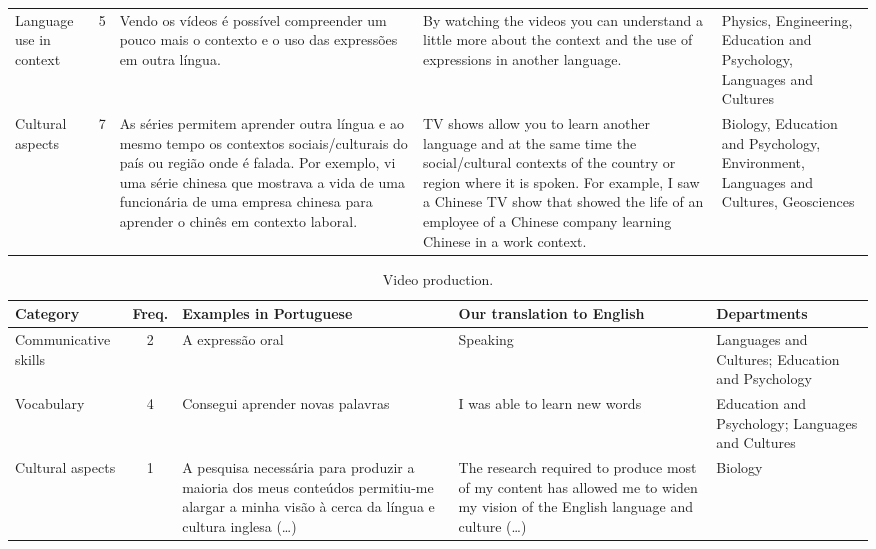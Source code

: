 \begin{table}[htpb]
\begin{threeparttable}
\begin{tabular}{p{1.5cm} c p{3cm} p{3cm} p{3cm}}
Language use in context & 5 & Vendo os vídeos é possível compreender um pouco mais o contexto e o uso das expressões em outra língua. & By watching the videos you can understand a little more about the context and the use of expressions in another language. & Physics, Engineering, Education and Psychology, Languages and Cultures \\
Cultural aspects & 7 & As séries permitem aprender outra língua e ao mesmo tempo os contextos sociais/culturais do país ou região onde é falada. Por exemplo, vi uma série chinesa que mostrava a vida de uma funcionária de uma empresa chinesa para aprender o chinês em contexto laboral. & TV shows allow you to learn another language and at the same time the social/cultural contexts of the country or region where it is spoken. For example, I saw a Chinese TV show that showed the life of an employee of a Chinese company learning Chinese in a work context. & Biology, Education and Psychology, Environment, Languages and Cultures, Geosciences \\
\bottomrule
\end{tabular}
\end{threeparttable}
\end{table}



\newpage
\begin{table}[htbp]
\centering
\footnotesize
\begin{threeparttable}
\begin{tabular}{p{1.5cm} c p{3cm} p{3cm} p{3cm}}
\caption{Video production.}
\label{tab-08}\\
\toprule
Category & Freq. & Examples in Portuguese & Our translation to English & Departments \\
\midrule
Communicative skills & 2 & A expressão oral & Speaking & Languages and Cultures; Education and Psychology \\
Vocabulary & 4 & Consegui aprender novas palavras & I was able to learn new words & Education and Psychology; Languages and Cultures \\
Cultural aspects & 1 & A pesquisa necessária para produzir a maioria dos meus conteúdos permitiu-me alargar a minha visão à cerca da língua e cultura inglesa (\ldots) & The research required to produce most of my content has allowed me to widen my vision of the English language and culture (\ldots) & Biology \\
\bottomrule
\end{tabular}
\end{threeparttable}
\end{table}




